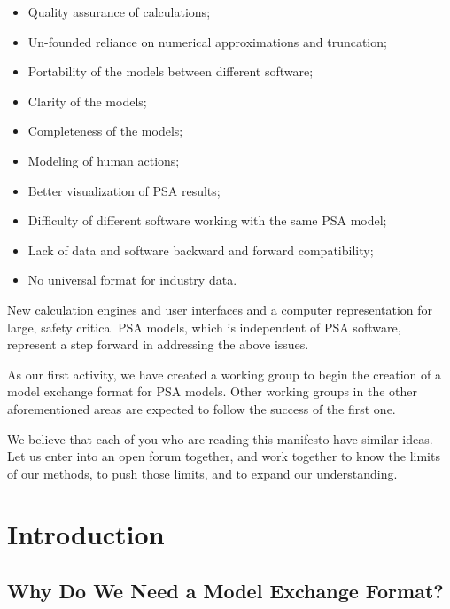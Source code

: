 \documentclass[11pt]{article}
\begin{document}
\begin{itemize}
\item Quality assurance of calculations;

\item Un-founded reliance on numerical approximations and truncation;

\item Portability of the models between different software;

\item Clarity of the models;

\item Completeness of the models;

\item Modeling of human actions;

\item Better visualization of PSA results;

\item Difficulty of different software working with the same PSA model;

\item Lack of data and software backward and forward compatibility;

\item No universal format for industry data.
\end{itemize}

New calculation engines and user interfaces and a computer
representation for large, safety critical PSA models, which is
independent of PSA software, represent a step forward in addressing the
above issues.

As our first activity, we have created a working group to begin the
creation of a model exchange format for PSA models. Other working groups
in the other aforementioned areas are expected to follow the success of
the first one.

We believe that each of you who are reading this manifesto have similar
ideas. Let us enter into an open forum together, and work together to
know the limits of our methods, to push those limits, and to expand our
understanding.

\section{Introduction}
\label{sec:org4943f7f}


\subsection{Why Do We Need a Model Exchange Format?}
\label{sec:org0899704}
\end{document}
